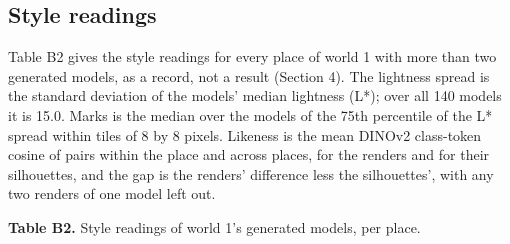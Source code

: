 \subsection{Style readings}\label{style-readings}

Table B2 gives the style readings for every place of world 1 with more than two generated models, as a record, not a result (Section 4). The lightness spread is the standard deviation of the models' median lightness (L*); over all 140 models it is 15.0. Marks is the median over the models of the 75th percentile of the L* spread within tiles of 8 by 8 pixels. Likeness is the mean DINOv2 class-token cosine of pairs within the place and across places, for the renders and for their silhouettes, and the gap is the renders' difference less the silhouettes', with any two renders of one model left out.

\textbf{Table B2.} Style readings of world 1's generated models, per place.

